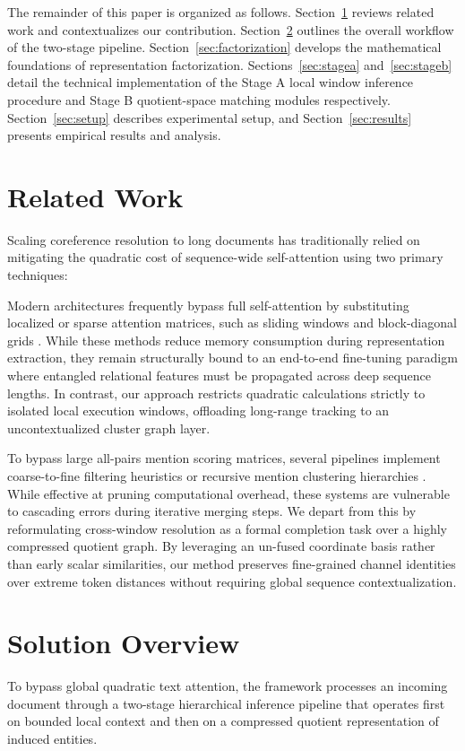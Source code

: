 \documentclass[12pt]{article}
\begin{document}
	The remainder of this paper is organized as follows. Section~\ref{sec:related} reviews related work and contextualizes our contribution. Section~\ref{sec:overview} outlines the overall workflow of the two-stage pipeline. Section~\ref{sec:factorization} develops the mathematical foundations of representation factorization. Sections~\ref{sec:stagea} and~\ref{sec:stageb} detail the technical implementation of the Stage A local window inference procedure and Stage B quotient-space matching modules respectively. Section~\ref{sec:setup} describes experimental setup, and Section~\ref{sec:results} presents empirical results and analysis.
	
	\section{Related Work}\label{sec:related}
	Scaling coreference resolution to long documents has traditionally relied on mitigating the quadratic cost of sequence-wide self-attention using two primary techniques:
	
	Modern architectures frequently bypass full self-attention by substituting localized or sparse attention matrices, such as sliding windows and block-diagonal grids \citep{caciularu2023peek}. While these methods reduce memory consumption during representation extraction, they remain structurally bound to an end-to-end fine-tuning paradigm where entangled relational features must be propagated across deep sequence lengths. In contrast, our approach restricts quadratic calculations strictly to isolated local execution windows, offloading long-range tracking to an uncontextualized cluster graph layer.
	
	To bypass large all-pairs mention scoring matrices, several pipelines implement coarse-to-fine filtering heuristics \citep{dobrovolskii2021word, bohnet2023coreference} or recursive mention clustering hierarchies \citep{luo2025imcoref}. While effective at pruning computational overhead, these systems are vulnerable to cascading errors during iterative merging steps. We depart from this by reformulating cross-window resolution as a formal completion task over a highly compressed quotient graph. By leveraging an un-fused coordinate basis rather than early scalar similarities, our method preserves fine-grained channel identities over extreme token distances without requiring global sequence contextualization.
	
	\section{Solution Overview}\label{sec:overview}
	To bypass global quadratic text attention, the framework processes an incoming document through a two-stage hierarchical inference pipeline that operates first on bounded local context and then on a compressed quotient representation of induced entities.
	
\end{document}
